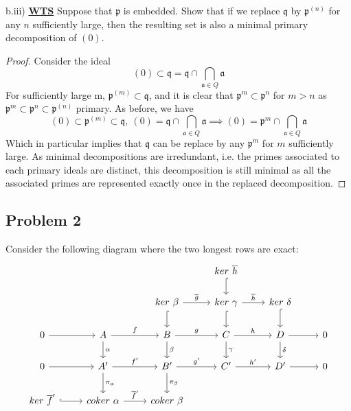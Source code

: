 \documentclass{article}
\newcommand{\fk}[1]{\mathfrak{#1}}
\begin{document}
b.iii) \textbf{\underline{WTS}} Suppose that $\fk{p}$ is embedded. Show that if we replace $\fk{q}$ by $\fk{p}^{(n)}$ for any $n$ sufficiently large, then the resulting set is also a minimal primary decomposition of $(0)$.
\begin{proof}
  Consider the ideal \[(0) \subset \fk{q} = \fk{q} \cap \bigcap_{\fk{a} \in Q}\fk{a}\] For sufficiently large m, $\fk{p}^{(m)}\subset \fk{q}$, and it is clear that $\fk{p}^{m} \subset \fk{p}^{n}$ for $m > n$ as $\fk{p}^{m} \subset \fk{p}^{n} \subset \fk{p}^{(n)}$ primary. As before, we have
  \[(0) \subset \fk{p}^{(m)} \subset \fk{q}, \  (0) = \fk{q} \cap \bigcap_{\fk{a} \in Q}\fk{a} \implies (0) = \fk{p}^{m} \cap \bigcap_{\fk{a} \in Q}\fk{a}\]
  Which in particular implies that $\fk{q}$ can be replace by any $\fk{p}^{m}$ for $m$ sufficiently large. As minimal decompositions are irredundant, i.e. the primes associated to each primary ideals are distinct, this decomposition is still minimal as all the associated primes are represented exactly once in the replaced decomposition. 
\end{proof}

\vspace{0.3in}
\subsection*{Problem 2}

Consider the following diagram where the two longest rows are exact: 
\[
\begin{tikzcd}
                                   &                                          &                                                      & ker \ \overline h \arrow[d, hook]                     &                                 &   \\
                                   &                                          & ker \ \beta \arrow[r, "\overline g"] \arrow[d, hook] & ker \ \gamma \arrow[d, hook] \arrow[r, "\overline h"] & ker \ \delta \arrow[d, hook]    &   \\
0 \arrow[r]                        & A \arrow[r, "f"] \arrow[d, "\alpha"]     & B \arrow[r, "g"] \arrow[d, "\beta"]                  & C \arrow[r, "h"] \arrow[d, "\gamma"]                  & D \arrow[r] \arrow[d, "\delta"] & 0 \\
0 \arrow[r]                        & A' \arrow[r, "f'"] \arrow[d, "\pi_{\alpha}"]             & B' \arrow[r, "g'"] \arrow[d, "\pi_{\beta}"]                         & C' \arrow[r, "h'"]                                    & D' \arrow[r]                    & 0 \\
ker \ \overline f' \arrow[r, hook] & coker \ \alpha \arrow[r, "\overline f'"] & coker \ \beta                                        &                                                       &                                 &  
\end{tikzcd}
\]
\end{document}
